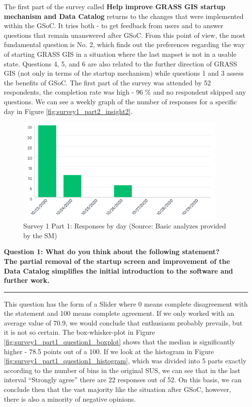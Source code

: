 \documentclass[a4paper,10pt,twoside]{article}
\begin{document}
\noindent The first part of the survey called \textbf {Help improve GRASS GIS startup mechanism and Data Catalog} returns to the changes that were implemented within the GSoC. It tries both - to get feedback from users and to answer questions that remain unanswered after GSoC. From this point of view, the most fundamental question is No. 2, which finds out the preferences regarding the way of starting GRASS GIS in a situation where the last mapset is not in a usable state. Questions 4, 5, and 6 are also related to the further direction of GRASS GIS (not only in terms of the startup mechanism) while questions 1 and 3 assess the benefits of GSoC. The first part of the survey was attended by 52 respondents, the completion rate was high - 96 \% and no respondent skipped any questions. We can see a weekly graph of the number of responses for a specific day in Figure \ref{fig:survey1_part2_insight2}.

\begin{figure}[hbt!] 
\begin{center}
\includegraphics[width=10.5cm]{../surveys/analyzed_data/survey1_part1_insight2.png} 
\caption[Survey 1 Part 1: Responses by day]{Survey 1 Part 1: Responses by day (Source: Basic analyzes provided by the SM)}
\label{fig:survey1_part1_insight2}
\end{center}
\end{figure}

\newpage
\noindent \textbf{Question 1: What do you think about the following statement? \\
The partial removal of the startup screen and improvement of the Data Catalog simplifies the initial introduction to the software and further work.}
\par\noindent\rule{\textwidth}{0.4pt}

\noindent This question has the form of a Slider where 0 means complete disagreement with the statement and 100 means complete agreement. If we only worked with an average value of 70.9, we would conclude that enthusiasm probably prevails, but it is not so certain. The box-whisker-plot in Figure \ref{fig:survey1_part1_question1_boxplot} shows that the median is significantly higher - 78.5 points out of a 100. If we look at the histogram in Figure \ref{fig:survey1_part1_question1_histogram}, which was divided into 5 parts exactly according to the number of bins in the original SUS, we can see that in the last interval ``Strongly agree'' there are 22 responses out of 52. On this basis, we can conclude then that the vast majority like the situation after GSoC, however, there is also a minority of negative opinions.
\end{document}
